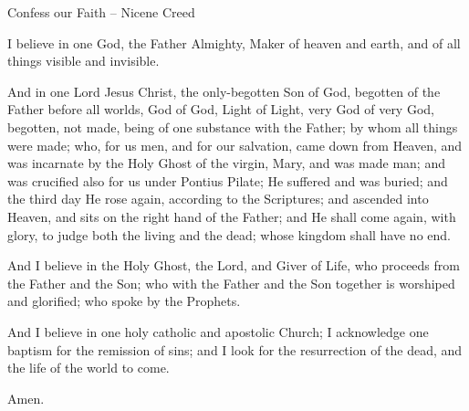 Confess our Faith -- Nicene Creed \\
	\vspace{.4em}
\begin{leftbar}
I believe in one God, the Father Almighty, Maker of heaven and earth,
and of all things visible and invisible.

And in one Lord Jesus Christ,
the only-begotten Son of God, begotten of the Father before all worlds,
God of God, Light of Light, very God of very God, begotten, not made,
being of one substance with the Father; by whom all things were made;
who, for us men, and for our salvation, came down from Heaven,
and was incarnate by the Holy Ghost of the virgin, Mary,
and was made man;
and was crucified also for us under Pontius Pilate;
He suffered and was buried;
and the third day He rose again, according to the Scriptures;
and ascended into Heaven, and sits on the right hand of the Father;
and He shall come again, with glory,
to judge both the living and the dead;
whose kingdom shall have no end.

And I believe in the Holy Ghost, the Lord, and Giver of Life,
who proceeds from the Father and the Son;
who with the Father and the Son together is worshiped and glorified;
who spoke by the Prophets.

And I believe in one holy catholic and apostolic Church;
I acknowledge one baptism for the remission of sins;
and I look for the resurrection of the dead,
and the life of the world to come.

Amen.
\end{leftbar}

\vspace{-1em}

